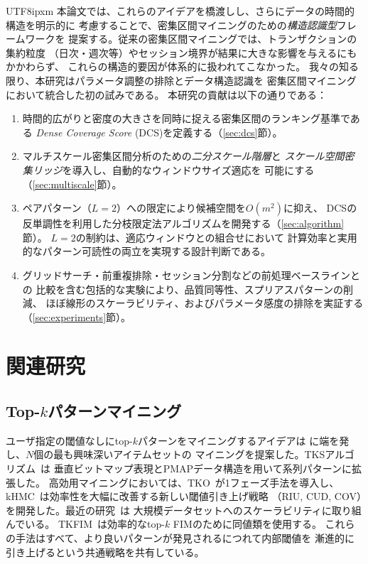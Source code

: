 \documentclass[conference]{IEEEtran}
\begin{document}
\begin{CJK}{UTF8}{ipxm}
本論文では、これらのアイデアを橋渡しし、さらにデータの時間的構造を明示的に
考慮することで、密集区間マイニングのための\emph{構造認識型}フレームワークを
提案する。従来の密集区間マイニングでは、トランザクションの集約粒度
（日次・週次等）やセッション境界が結果に大きな影響を与えるにもかかわらず、
これらの構造的要因が体系的に扱われてこなかった。
我々の知る限り、本研究はパラメータ調整の排除とデータ構造認識を
密集区間マイニングにおいて統合した初の試みである。
本研究の貢献は以下の通りである：

\begin{enumerate}
\item 時間的広がりと密度の大きさを同時に捉える密集区間のランキング基準である
  \emph{Dense Coverage Score} (DCS)を定義する（\ref{sec:dcs}節）。

\item マルチスケール密集区間分析のための\emph{二分スケール階層}と
  \emph{スケール空間密集リッジ}を導入し、自動的なウィンドウサイズ適応を
  可能にする（\ref{sec:multiscale}節）。

\item ペアパターン（$L{=}2$）への限定により候補空間を$O(m^2)$に抑え、
  DCSの反単調性を利用した分枝限定法アルゴリズムを開発する（\ref{sec:algorithm}節）。
  $L{=}2$の制約は、適応ウィンドウとの組合せにおいて
  計算効率と実用的なパターン可読性の両立を実現する設計判断である。

\item グリッドサーチ・前重複排除・セッション分割などの前処理ベースラインとの
  比較を含む包括的な実験により、品質同等性、スプリアスパターンの削減、
  ほぼ線形のスケーラビリティ、およびパラメータ感度の排除を実証する
  （\ref{sec:experiments}節）。
\end{enumerate}

\section{関連研究}\label{sec:related}

\subsection{Top-$k$パターンマイニング}

ユーザ指定の閾値なしにtop-$k$パターンをマイニングするアイデアは
\cite{fu2004mining}に端を発し、$N$個の最も興味深いアイテムセットの
マイニングを提案した。TKSアルゴリズム~\cite{fournierviger2013tks}は
垂直ビットマップ表現とPMAPデータ構造を用いて系列パターンに拡張した。
高効用マイニングにおいては、TKO~\cite{tseng2015tko}が1フェーズ手法を導入し、
kHMC~\cite{duong2016kHMC}は効率性を大幅に改善する新しい閾値引き上げ戦略
（RIU, CUD, COV）を開発した。最近の研究~\cite{morrison2024topk}は
大規模データセットへのスケーラビリティに取り組んでいる。
TKFIM~\cite{fatima2021tkfim}は効率的なtop-$k$ FIMのために同値類を使用する。
これらの手法はすべて、より良いパターンが発見されるにつれて内部閾値を
漸進的に引き上げるという共通戦略を共有している。


\end{CJK}
\end{document}
